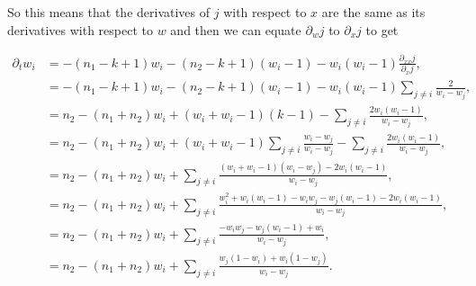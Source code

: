     So this means that the derivatives of $j$ with respect to $x$ are the same as its derivatives with respect to $w$ and then we can equate $\partial_w j$ to $\partial_x j$ to get

    \begin{align*}
        \partial_t w_i &= -(n_1-k+1)w_i - (n_2 -k+1)(w_i-1) - w_i(w_i-1)\frac{\partial_{xx} j}{\partial_x j},\\ 
        &=-(n_1-k+1)w_i - (n_2 -k+1)(w_i-1) - w_i(w_i-1)\sum_{j \neq i} \frac{2}{w_i - w_j},\\ 
        &= n_2 - (n_1 + n_2)w_i + (w_i + w_i -1)(k-1) - \sum_{j\neq i} \frac{2w_i(w_i -1)}{w_i - w_j},\\
        &= n_2 - (n_1 + n_2)w_i + (w_i + w_i -1)\sum_{j \neq i}\frac{w_i - w_j}{w_i - w_j} - \sum_{j\neq i} \frac{2w_i(w_i -1)}{w_i - w_j},\\ 
        &= n_2 - (n_1 + n_2)w_i + \sum_{j \neq i}\frac{ (w_i + w_i -1)(w_i - w_j) - 2 w_i(w_i-1) }{w_i - w_j},\\ 
        &= n_2 - (n_1 + n_2)w_i + \sum_{j \neq i}\frac{ w_i^2 + w_i(w_i-1) - w_iw_j -w_j(w_i-1) -2w_i(w_i-1) }{w_i - w_j},\\
        &=  n_2 - (n_1 + n_2)w_i + \sum_{j \neq i}\frac{ - w_iw_j - w_j(w_i-1) +w_i }{w_i - w_j},\\
        &= n_2 - (n_1 + n_2)w_i + \sum_{j \neq i}\frac{w_j(1-w_i) +w_i(1-w_j)}{w_i - w_j}.
    \end{align*}
    

